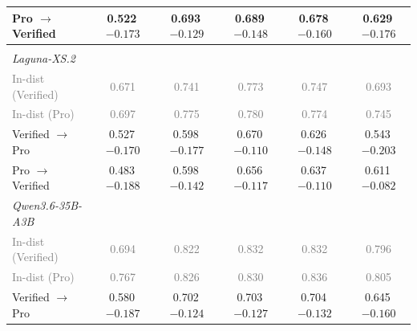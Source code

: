\begin{table}[t]
\begin{tabular}{lccccc}
\qquad{}Pro $\rightarrow$ Verified & 0.522\,{\scriptsize \textcolor{red!70!black}{$-0.173$}} & 0.693\,{\scriptsize \textcolor{red!70!black}{$-0.129$}} & 0.689\,{\scriptsize \textcolor{red!70!black}{$-0.148$}} & 0.678\,{\scriptsize \textcolor{red!70!black}{$-0.160$}} & 0.629\,{\scriptsize \textcolor{red!70!black}{$-0.176$}}  \\
\midrule
\multicolumn{6}{l}{\textit{\RedFail{}}} \\
\quad{}\textit{Laguna-XS.2} \\
\qquad{}\textcolor{gray}{\small In-dist (Verified)} & \textcolor{gray}{\small 0.671} & \textcolor{gray}{\small 0.741} & \textcolor{gray}{\small 0.773} & \textcolor{gray}{\small 0.747} & \textcolor{gray}{\small 0.693} \\
\qquad{}\textcolor{gray}{\small In-dist (Pro)} & \textcolor{gray}{\small 0.697} & \textcolor{gray}{\small 0.775} & \textcolor{gray}{\small 0.780} & \textcolor{gray}{\small 0.774} & \textcolor{gray}{\small 0.745} \\
\qquad{}Verified $\rightarrow$ Pro & 0.527\,{\scriptsize \textcolor{red!70!black}{$-0.170$}} & 0.598\,{\scriptsize \textcolor{red!70!black}{$-0.177$}} & 0.670\,{\scriptsize \textcolor{red!70!black}{$-0.110$}} & 0.626\,{\scriptsize \textcolor{red!70!black}{$-0.148$}} & 0.543\,{\scriptsize \textcolor{red!70!black}{$-0.203$}}  \\
\qquad{}Pro $\rightarrow$ Verified & 0.483\,{\scriptsize \textcolor{red!70!black}{$-0.188$}} & 0.598\,{\scriptsize \textcolor{red!70!black}{$-0.142$}} & 0.656\,{\scriptsize \textcolor{red!70!black}{$-0.117$}} & 0.637\,{\scriptsize \textcolor{red!70!black}{$-0.110$}} & 0.611\,{\scriptsize \textcolor{red!70!black}{$-0.082$}}  \\
\quad{}\textit{Qwen3.6-35B-A3B} \\
\qquad{}\textcolor{gray}{\small In-dist (Verified)} & \textcolor{gray}{\small 0.694} & \textcolor{gray}{\small 0.822} & \textcolor{gray}{\small 0.832} & \textcolor{gray}{\small 0.832} & \textcolor{gray}{\small 0.796} \\
\qquad{}\textcolor{gray}{\small In-dist (Pro)} & \textcolor{gray}{\small 0.767} & \textcolor{gray}{\small 0.826} & \textcolor{gray}{\small 0.830} & \textcolor{gray}{\small 0.836} & \textcolor{gray}{\small 0.805} \\
\qquad{}Verified $\rightarrow$ Pro & 0.580\,{\scriptsize \textcolor{red!70!black}{$-0.187$}} & 0.702\,{\scriptsize \textcolor{red!70!black}{$-0.124$}} & 0.703\,{\scriptsize \textcolor{red!70!black}{$-0.127$}} & 0.704\,{\scriptsize \textcolor{red!70!black}{$-0.132$}} & 0.645\,{\scriptsize \textcolor{red!70!black}{$-0.160$}}  \\

\end{tabular}
\end{table}
